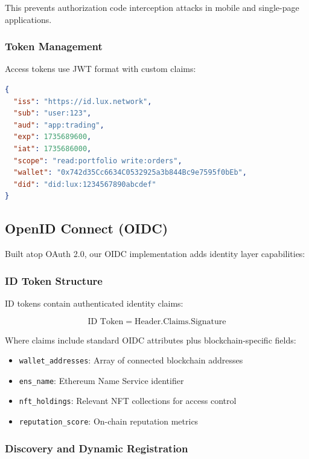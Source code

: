 This prevents authorization code interception attacks in mobile and single-page applications.

\subsubsection{Token Management}

Access tokens use JWT format with custom claims:

\begin{lstlisting}[language=json]
{
  "iss": "https://id.lux.network",
  "sub": "user:123",
  "aud": "app:trading",
  "exp": 1735689600,
  "iat": 1735686000,
  "scope": "read:portfolio write:orders",
  "wallet": "0x742d35Cc6634C0532925a3b844Bc9e7595f0bEb",
  "did": "did:lux:1234567890abcdef"
}
\end{lstlisting}

\subsection{OpenID Connect (OIDC)}

Built atop OAuth 2.0, our OIDC implementation adds identity layer capabilities:

\subsubsection{ID Token Structure}

ID tokens contain authenticated identity claims:

\begin{equation}
    \text{ID Token} = \text{Header}.\text{Claims}.\text{Signature}
\end{equation}

Where claims include standard OIDC attributes plus blockchain-specific fields:

\begin{itemize}
    \item \texttt{wallet\_addresses}: Array of connected blockchain addresses
    \item \texttt{ens\_name}: Ethereum Name Service identifier
    \item \texttt{nft\_holdings}: Relevant NFT collections for access control
    \item \texttt{reputation\_score}: On-chain reputation metrics
\end{itemize}

\subsubsection{Discovery and Dynamic Registration}

